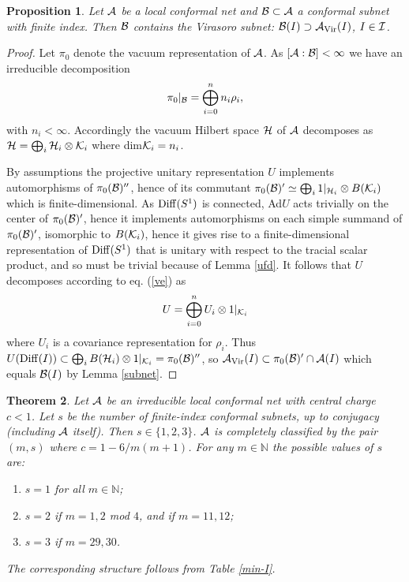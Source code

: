 \documentclass[12pt]{article}
\def\Diff{{\rm Diff}}
\def\Vir{{\rm Vir}}
\def\r{\rho}
\newtheorem{theorem}{Theorem}[section]
\newtheorem{proposition}[theorem]{Proposition}
\def\A{{\cal A}}
\def\B{{\cal B}}
\def\I{{\cal I}}
\def\K{{\cal K}}
\def\H{{\cal H}}
\begin{document}
\begin{proposition}\label{ba}
Let $\A$ be a local conformal net and $\B\subset\A$ a conformal subnet 
with finite index.  
Then $\B$ contains the Virasoro subnet:
$\B(I)\supset \A_{\Vir}(I)$, $I\in\I$.
\end{proposition}

\begin{proof}
Let $\pi_0$ denote the vacuum representation of $\A$. 
As $[\A:\B]<\infty$ we have an irreducible decomposition
\begin{equation}\label{ve}
\pi_0 |_{\B} = \bigoplus_{i=0}^n n_i \r_i ,
\end{equation}
with $n_i<\infty$. Accordingly the vacuum Hilbert space $\H$ of $\A$ 
decomposes as $\H=\bigoplus_i \H_i\otimes\K_i$ where dim$\K_i = n_i$.

By assumptions the projective unitary representation $U$ implements 
automorphisms of $\pi_0(\B)''$, hence of its commutant 
$\pi_0(\B)'\simeq \bigoplus_i 1|_{\H_i}\otimes B(\K_i)$ 
which is finite-dimensional. As $\Diff(S^1)$ is 
connected, Ad$U$ acts trivially on the center of $\pi_0(\B)'$, hence 
it implements automorphisms on each simple summand of $\pi_0(\B)'$, 
isomorphic to $B(\K_i)$, hence it gives rise to a 
finite-dimensional representation of $\Diff(S^1)$ that is unitary with 
respect to the tracial scalar product, and so must be trivial because 
of Lemma \ref{ufd}.
It follows that $U$ decomposes according to eq. (\ref{ve}) as
\[
U= \bigoplus_{i=0}^n  U_i\otimes 1|_{\K_i} 
\]
where $U_i$ is a covariance representation for $\r_i$. Thus 
$U(\Diff(I))\subset \bigoplus_i B(\H_i)\otimes 1|_{\K_i}=\pi_0(\B)''$, 
so $\A_{\Vir}(I)\subset \pi_0(\B)'\cap\A(I)$ which equals $\B(I)$ 
by Lemma \ref{subnet}.
\end{proof}

\begin{theorem} Let $\A$ be an irreducible local conformal net with 
central charge $c<1$. Let $s$ be the number of 
finite-index conformal subnets, up to conjugacy (including $\A$ itself). Then 
$s\in\{1,2,3\}$. $\A$ is completely classified by the 
pair $(m,s)$ where $c=1-6/m(m+1)$. For any $m\in\mathbb N$ the 
possible values of $s$ are: 
\begin{enumerate}
\item $s=1$ for all $m\in\mathbb N$;
\item $s=2$ if $m=1,2$ {\rm mod} $4$, and if $m=11,12$;
\item $s=3$ if $m=29,30$.
\end{enumerate}
The corresponding structure follows from Table \ref{min-I}.
\end{theorem}
\end{document}
